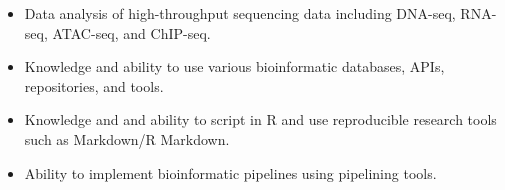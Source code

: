 \documentclass[letterpaper, 10pt]{article}
\begin{document}
\begin{itemize}
   \setlength\itemsep{0em}
   \item Data analysis of high-throughput sequencing data including DNA-seq, RNA-seq, ATAC-seq, and ChIP-seq.
   \item Knowledge and ability to use various bioinformatic databases, APIs, repositories, and tools.
   \item Knowledge and and ability to script in R and use reproducible research tools such as Markdown/R Markdown.
   \item Ability to implement bioinformatic pipelines using pipelining tools.
\end{itemize}



\end{document}
